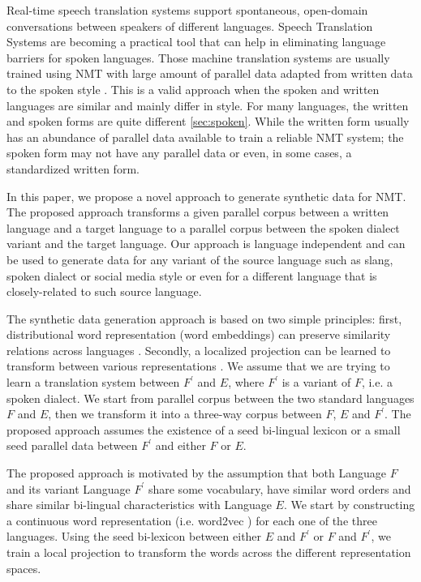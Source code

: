 \documentclass[a4paper]{article}
\begin{document}
Real-time speech translation systems support spontaneous, open-domain conversations between speakers of different languages. Speech Translation Systems are becoming a practical tool that can help in eliminating language barriers for spoken languages. 
Those machine translation systems are usually trained using NMT with large amount of parallel data adapted from written data to the spoken style \cite{umdiwslt}. This is a valid approach when the spoken and written languages are similar and mainly differ in style. For many languages, the written and spoken forms are quite different \textsection\ref{sec:spoken}. While the written form usually has an abundance of parallel data  available to train a reliable NMT system; the spoken form may not have any parallel data or even, in some cases, a standardized written form.


In this paper,  we propose a novel approach to generate synthetic data for NMT. The proposed approach  transforms a given parallel corpus between a  written language and a target language to a parallel corpus between the spoken dialect variant  and the target language. Our approach is language independent and can be used to generate data for any variant of the source language such as slang, spoken dialect or social media style or even for a different language that is closely-related to such source language.

  The synthetic data generation approach is based on two simple principles: first,  distributional word representation (word embeddings) can preserve similarity relations across languages \cite{MikolovSCCD13}. Secondly,  a localized  projection can be learned to transform between various representations \cite{ZhaoHA15}. We assume that we are trying to learn a translation system between $F^\prime$ and $E$, where $F^\prime$ is a variant of $F$, i.e. a spoken dialect. We start from parallel corpus between the two standard languages $F$ and $E$, then we transform it  into a three-way corpus between  $F$, $E$ and $F^\prime$.  The proposed approach assumes  the existence of  a seed bi-lingual lexicon or a small seed parallel data between $F^\prime$ and either $F$ or $E$. 
   

The proposed approach is motivated by the assumption that both Language $F$ and its variant Language $F^\prime$ share  some vocabulary, have similar word orders and share similar bi-lingual characteristics with Language $E$. We start by constructing a continuous word representation (i.e. word2vec \cite{MikolovSCCD13})  for each one of the three languages. Using the seed bi-lexicon between either $E$ and $F^\prime$  or $F$ and $F^\prime$, we train a local projection to transform the words across the different representation spaces. 
\end{document}
